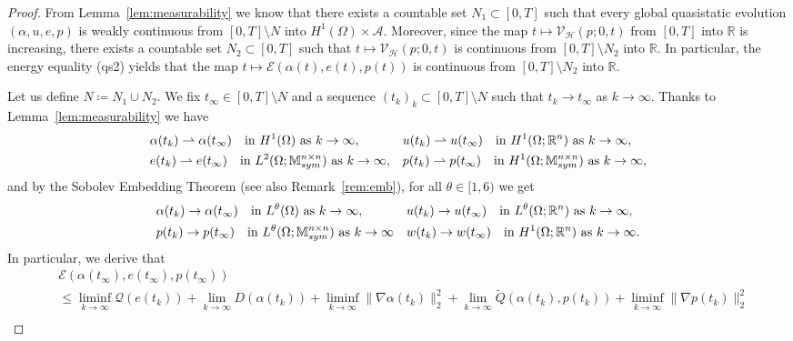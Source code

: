 \documentclass[reqno]{amsart}
\theoremstyle{definition}
\numberwithin{equation}{section}
\def\R {\mathbb R}
\def\M {\mathbb M^{n\times n}_{\rm sym}}
\begin{document}
\begin{proof}
From Lemma~\ref{lem:measurability} we know that there exists a countable set $N_1\subset [0,T]$ such that every global quasistatic evolution $(\alpha,u,e,p)$ is weakly continuous from $[0,T]\setminus N$ into $H^1(\Omega)\times \mathcal A$. Moreover, since the map $t\mapsto \mathcal V_{\mathcal H}(p;0,t)$ from $[0,T]$ into $\R$ is increasing, there exists a countable set $N_2\subset [0,T]$ such that $t\mapsto \mathcal V_{\mathcal H}(p;0,t)$ is continuous from $[0,T]\setminus N_2$ into $\R$. In particular, the  energy equality (qs2) yields that the map $t\mapsto \mathcal E(\alpha(t),e(t),p(t))$ is continuous from $[0,T]\setminus N_2$ into $\R$.

Let us define $N\coloneqq N_1\cup N_2$. We fix $t_\infty\in[0,T]\setminus N$ and a sequence $(t_k)_k\subset [0,T]\setminus N$ such that $t_k\to t_\infty$ as $k\to\infty$. Thanks to Lemma~\ref{lem:measurability} we have
\begin{align*}
&\alpha(t_k)\rightharpoonup \alpha(t_\infty)\quad\text{in $H^1(\Omega)$ as $k\to\infty$},& &u(t_k)\rightharpoonup u(t_\infty)\quad\text{in $H^1(\Omega;\R^n)$ as $k\to\infty$},\\
& e(t_k)\rightharpoonup e(t_\infty)\quad\text{in $L^2(\Omega;\M)$ as $k\to\infty$},& & p(t_k)\rightharpoonup p(t_\infty)\quad\text{in $H^1(\Omega;\M)$ as $k\to\infty$},
\end{align*}
and by the Sobolev Embedding Theorem (see also Remark~\ref{rem:emb}), for all $\theta\in [1,6)$ we get
\begin{align*}
&\alpha(t_k)\to \alpha(t_\infty)\quad\text{in $L^\theta(\Omega)$ as $k\to\infty$},& &u(t_k)\to u(t_\infty)\quad\text{in $L^\theta(\Omega;\R^n)$ as $k\to\infty$},\\
&p(t_k)\to p(t_\infty)\quad\text{in $L^\theta(\Omega;\M)$ as $k\to\infty$} & &w(t_k)\to w(t_\infty)\quad\text{in $H^1(\Omega;\R^n)$ as $k\to\infty$}.
\end{align*}  
In particular, we derive that
\begin{align*}
&\mathcal E(\alpha(t_\infty),e(t_\infty),p(t_\infty))\\
&\le\liminf_{k\to\infty}\mathcal Q(e(t_k))+\lim_{k\to\infty}D(\alpha(t_k))+\liminf_{k\to\infty}\|\nabla\alpha(t_k)\|_2^2+\lim_{k\to\infty}\tilde Q(\alpha(t_k),p(t_k))+\liminf_{k\to\infty}\|\nabla p(t_k)\|_2^2\\

\end{align*}
\end{proof}
\end{document}
